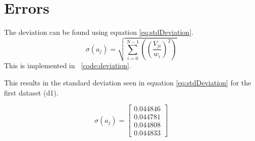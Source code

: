 \section{Errors}
The deviation can be found using equation \ref{eq:stdDeviation}.
\[
\sigma\left(a_j\right) = \sqrt{ \sum_{i=0}^{N-1} \left( \left( \frac{V_{ji}}{w_i}\right)^2\right) }
\label{eq:stdDeviation}
\]
This is implemented in \lstlistingname~\ref{code:deviation}.


This results in the standard deviation seen in equation \ref{eq:stdDeviation} for the first dataset (d1).

\begin{equation}
\sigma\left(a_j\right) = 
\left[
\begin{array}{c}
 0.044846 \\
 0.044781 \\
 0.044808 \\
 0.044833
\end{array}
\right]
\label{eq:stdDeviation}
\end{equation}